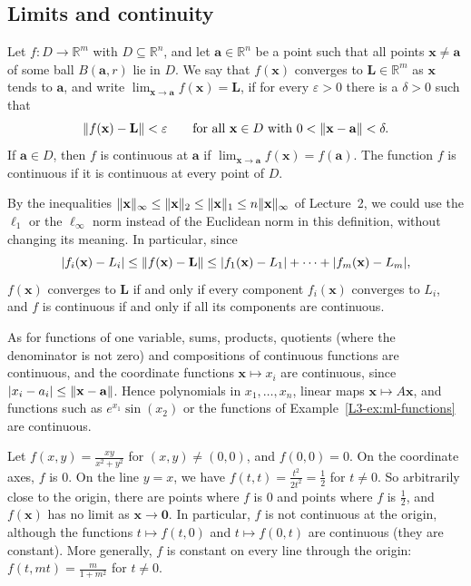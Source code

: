 \subsection{Limits and continuity}

\begin{definition}\label{L3-def:limit}
    Let $f: D \to \mathbb{R}^m$ with $D \subseteq \mathbb{R}^n$, and let $\mathbf{a} \in \mathbb{R}^n$ be a point such that all points $\mathbf{x} \neq \mathbf{a}$ of some ball $B(\mathbf{a}, r)$ lie in $D$. We say that $f(\mathbf{x})$ converges to $\mathbf{L} \in \mathbb{R}^m$ as $\mathbf{x}$ tends to $\mathbf{a}$, and write $\lim_{\mathbf{x} \to \mathbf{a}} f(\mathbf{x}) = \mathbf{L}$, if for every $\varepsilon > 0$ there is a $\delta > 0$ such that
    \[\lVert f(\mathbf{x}) - \mathbf{L} \rVert < \varepsilon \qquad \text{for all } \mathbf{x} \in D \text{ with } 0 < \lVert \mathbf{x} - \mathbf{a} \rVert < \delta.\]
    If $\mathbf{a} \in D$, then $f$ is continuous at $\mathbf{a}$ if $\lim_{\mathbf{x} \to \mathbf{a}} f(\mathbf{x}) = f(\mathbf{a})$. The function $f$ is continuous if it is continuous at every point of $D$.
\end{definition}

By the inequalities $\lVert \mathbf{x} \rVert_\infty \leq \lVert \mathbf{x} \rVert_2 \leq \lVert \mathbf{x} \rVert_1 \leq n \lVert \mathbf{x} \rVert_\infty$ of Lecture~2, we could use the $\ell_1$ or the $\ell_\infty$ norm instead of the Euclidean norm in this definition, without changing its meaning. In particular, since
\[|f_i(\mathbf{x}) - L_i| \leq \lVert f(\mathbf{x}) - \mathbf{L} \rVert \leq |f_1(\mathbf{x}) - L_1| + \cdots + |f_m(\mathbf{x}) - L_m|,\]
$f(\mathbf{x})$ converges to $\mathbf{L}$ if and only if every component $f_i(\mathbf{x})$ converges to $L_i$, and $f$ is continuous if and only if all its components are continuous.

As for functions of one variable, sums, products, quotients (where the denominator is not zero) and compositions of continuous functions are continuous, and the coordinate functions $\mathbf{x} \mapsto x_i$ are continuous, since $|x_i - a_i| \leq \lVert \mathbf{x} - \mathbf{a} \rVert$. Hence polynomials in $x_1, \ldots, x_n$, linear maps $\mathbf{x} \mapsto A\mathbf{x}$, and functions such as $e^{x_1} \sin(x_2)$ or the functions of Example~\ref{L3-ex:ml-functions} are continuous.

\begin{example}\label{L3-ex:xy}
    Let $f(x, y) = \frac{xy}{x^2 + y^2}$ for $(x, y) \neq (0, 0)$, and $f(0, 0) = 0$. On the coordinate axes, $f$ is $0$. On the line $y = x$, we have $f(t, t) = \frac{t^2}{2t^2} = \frac{1}{2}$ for $t \neq 0$. So arbitrarily close to the origin, there are points where $f$ is $0$ and points where $f$ is $\frac{1}{2}$, and $f(\mathbf{x})$ has no limit as $\mathbf{x} \to \mathbf{0}$. In particular, $f$ is not continuous at the origin, although the functions $t \mapsto f(t, 0)$ and $t \mapsto f(0, t)$ are continuous (they are constant). More generally, $f$ is constant on every line through the origin: $f(t, mt) = \frac{m}{1 + m^2}$ for $t \neq 0$.
\end{example}

